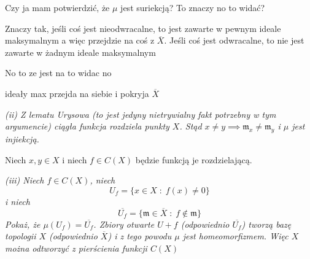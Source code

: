 \documentclass{article}
\begin{document}
Czy ja mam potwierdzić, że $\mu$ jest suriekcją? To znaczy no to widać?

Znaczy tak, jeśli coś jest nieodwracalne, to jest zawarte w pewnym ideale maksymalnym a więc przejdzie na coś z $\overline X$. Jeśli coś jest odwracalne, to nie jest zawarte w żadnym ideale maksymalnym

No to ze jest na to widac no

ideały max przejda na siebie i pokryja $\overline X$

\emph{\color{yellow}(ii) Z lematu Urysowa (to jest jedyny nietrywialny fakt potrzebny w tym argumencie) ciągła funkcja rozdziela punkty $X$. Stąd $x\neq y\implies\mathfrak{m}_x\neq\mathfrak{m}_y$ i $\mu$ jest injiekcją.}

Niech $x, y\in X$ i niech $f\in C(X)$ będzie funkcją je rozdzielającą.

\emph{\color{yellow}(iii) Niech $f\in C(X)$, niech}
$$U_f=\{x\in X\;:\;f(x)\neq 0\}$$
\emph{\color{yellow}i niech}
$$\overline{U_f}=\{\mathfrak{m}\in\overline X\;:\;f\notin \mathfrak{m}\}$$
\emph{\color{yellow}Pokaż, że $\mu(U_f)=\overline{U_f}$. Zbiory otwarte $U+f$ (odpowiednio $\overline{U_f}$) tworzą bazę topologii $X$ (odpowiednio $\overline X$) i z tego powodu $\mu$ jest homeomorfizmem. Więc $X$ można odtworzyć z pierścienia funkcji $C(X)$}
\end{document}
